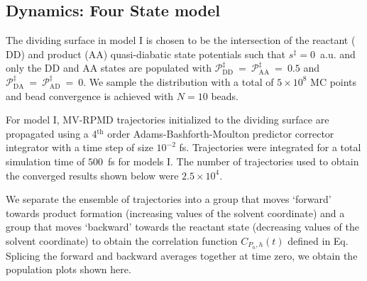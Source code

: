 \documentclass[phd,tocprelim]{cornell}
\begin{document}
\subsection{Dynamics: Four State model}
The dividing surface in model I is 
chosen to be the intersection of the reactant 
($\textrm{DD}$) and product ($\textrm{AA}$) quasi-diabatic 
state potentials such that $s^\ddag=0$~a.u.
and only the $\textrm{DD}$ and $\textrm{AA}$ states are 
populated with 
$\mathcal P_{\textrm{DD}}^\ddagger~=~\mathcal P_{\textrm{AA}}^\ddag~=~0.5$ and 
$\mathcal P_{\textrm{DA}}^\ddag~=~\mathcal P_{\textrm{AD}}^\ddag~=~0$.
We sample the distribution
with a total of $5\times 10^8$ MC points 
and bead convergence is achieved with $N=10$ beads.

For model I, MV-RPMD trajectories initialized
to the dividing surface are propagated 
using a 4$^\textrm{th}$ order Adams-Bashforth-Moulton predictor
corrector integrator with a time step of size $10^{-2}$ fs.
Trajectories were integrated for a total simulation
time of $500$~fs for models I. 
The number of trajectories used to obtain the converged results
shown below were $2.5\times 10^4$.

We separate the ensemble of trajectories
into a group that moves `forward' towards product
formation (increasing values of the solvent coordinate)
and a group that moves `backward' towards the reactant state 
(decreasing values of the solvent coordinate) to obtain
the correlation function $C_{P_n,h}(t)$ 
defined in Eq. Splicing the forward and 
backward averages together at time zero, we obtain the 
population plots shown here.
\end{document}
